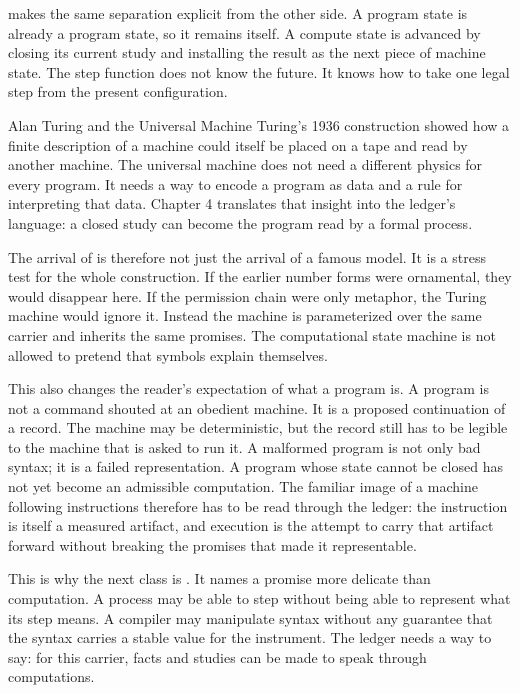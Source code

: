 makes the same separation explicit from the other side. A
program state is already a program state, so it remains itself. A compute state
is advanced by closing its current study and installing the result as the next
piece of machine state. The step function does not know the future. It knows
how to take one legal step from the present configuration.

\begin{sidebar}{Alan Turing and the Universal Machine}
\label{sb:turing-universal-machine}
Turing's 1936 construction showed how a finite description of a machine could
itself be placed on a tape and read by another machine. The universal machine
does not need a different physics for every program. It needs a way to encode a
program as data and a rule for interpreting that data. Chapter 4 translates
that insight into the ledger's language: a closed study can become the program
read by a formal process.
\end{sidebar}

The arrival of  is therefore not just the arrival of a
famous model. It is a stress test for the whole construction. If the earlier
number forms were ornamental, they would disappear here. If the permission
chain were only metaphor, the Turing machine would ignore it. Instead the
machine is parameterized over the same carrier and inherits the same promises.
The computational state machine is not allowed to pretend that symbols explain
themselves.

This also changes the reader's expectation of what a program is. A program is
not a command shouted at an obedient machine. It is a proposed continuation of
a record. The machine may be deterministic, but the record still has to be
legible to the machine that is asked to run it. A malformed program is not only
bad syntax; it is a failed representation. A program whose state cannot be
closed has not yet become an admissible computation. The familiar image of a
machine following instructions therefore has to be read through the ledger: the
instruction is itself a measured artifact, and execution is the attempt to
carry that artifact forward without breaking the promises that made it
representable.

This is why the next class is . It names a promise more
delicate than computation. A process may be able to step without being able to
represent what its step means. A compiler may manipulate syntax without any
guarantee that the syntax carries a stable value for the instrument. The
ledger needs a way to say: for this carrier, facts and studies can be made to
speak through computations.

